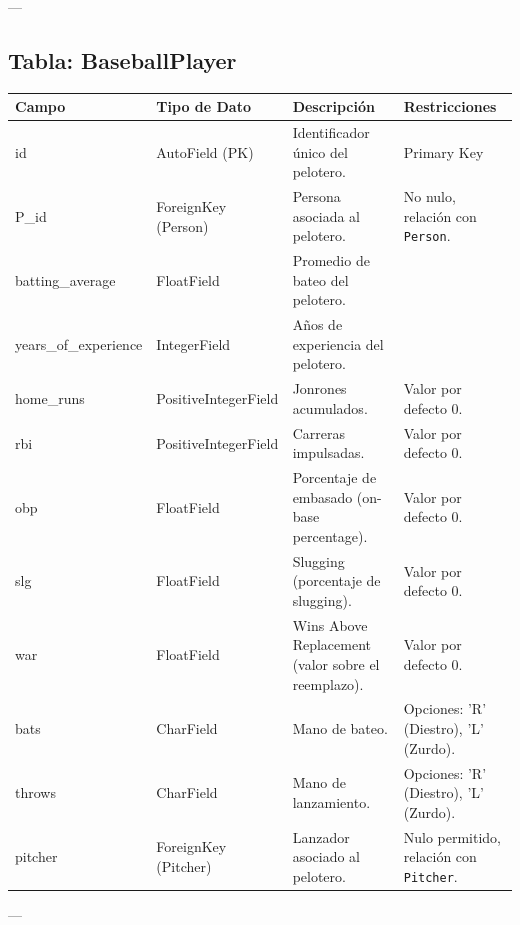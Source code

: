 \documentclass{report}
\begin{document}
    ---
    
    \subsection*{Tabla: BaseballPlayer}
    \begin{tabular}{|>{\raggedright\arraybackslash}p{3cm}|>{\raggedright\arraybackslash}p{3cm}|>{\raggedright\arraybackslash}p{6cm}|>{\raggedright\arraybackslash}p{4cm}|}
        \hline
        \textbf{Campo} & \textbf{Tipo de Dato} & \textbf{Descripción} & \textbf{Restricciones} \\
        \hline
        id & AutoField (PK) & Identificador único del pelotero. & Primary Key \\
        \hline
        P\_id & ForeignKey (Person) & Persona asociada al pelotero. & No nulo, relación con \texttt{Person}. \\
        \hline
        batting\_average & FloatField & Promedio de bateo del pelotero. &  \\
        \hline
        years\_of\_experience & IntegerField & Años de experiencia del pelotero. &  \\
        \hline
        home\_runs & PositiveIntegerField & Jonrones acumulados. & Valor por defecto 0. \\
        \hline
        rbi & PositiveIntegerField & Carreras impulsadas. & Valor por defecto 0. \\
        \hline
        obp & FloatField & Porcentaje de embasado (on-base percentage). & Valor por defecto 0. \\
        \hline
        slg & FloatField & Slugging (porcentaje de slugging). & Valor por defecto 0. \\
        \hline
        war & FloatField & Wins Above Replacement (valor sobre el reemplazo). & Valor por defecto 0. \\
        \hline
        bats & CharField & Mano de bateo. & Opciones: 'R' (Diestro), 'L' (Zurdo). \\
        \hline
        throws & CharField & Mano de lanzamiento. & Opciones: 'R' (Diestro), 'L' (Zurdo). \\
        \hline
        pitcher & ForeignKey (Pitcher) & Lanzador asociado al pelotero. & Nulo permitido, relación con \texttt{Pitcher}. \\
        \hline
    \end{tabular}
    
    ---
    
\end{document}
